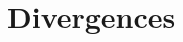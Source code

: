 \documentclass[11pt]{report}
\begin{document}
\setcounter{chapter}{6}

\chapter{Divergences}
\label{chap:lec6}

\end{document}

